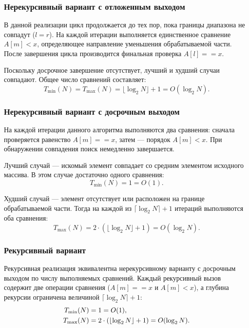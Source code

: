 \subsubsection{Нерекурсивный вариант с отложенным выходом}

В данной реализации цикл продолжается до тех пор, пока границы диапазона не совпадут ($l = r$). На каждой итерации выполняется единственное сравнение $A[m] < x$, определяющее направление уменьшения обрабатываемой части. После завершения цикла производится финальная проверка $A[l] == x$.

Поскольку досрочное завершение отсутствует, лучший и худший случаи совпадают. Общее число сравнений составляет:
\begin{equation}
	T_{\min}(N) = T_{\max}(N) = \lfloor \log_2 N \rfloor + 1 = O(\log_2 N).
\end{equation}

\subsubsection{Нерекурсивный вариант с досрочным выходом}

На каждой итерации данного алгоритма выполняются два сравнения: сначала проверяется равенство $A[m] == x$, затем --- порядок $A[m] < x$. При обнаружении совпадения поиск немедленно завершается.

Лучший случай --- искомый элемент совпадает со средним элементом исходного массива. В этом случае достаточно одного сравнения:
\begin{equation}
	T_{\min}(N) = 1 = O(1).
\end{equation}

Худший случай --- элемент отсутствует или расположен на границе обрабатываемой части. Тогда на каждой из $\lceil\log_2 N \rceil + 1$ итераций выполняются оба сравнения:
\begin{equation}
	T_{\max}(N) = 2 \cdot (\lfloor \log_2 N \rfloor + 1) = O(\log_2 N).
\end{equation}

\subsubsection{Рекурсивный вариант}

Рекурсивная реализация эквивалентна нерекурсивному варианту с досрочным выходом по числу выполняемых сравнений. Каждый рекурсивный вызов содержит две операции сравнения ($A[m] == x$ и $A[m] < x$), а глубина рекурсии ограничена величиной $\lceil\log_2 N \rceil + 1$:
\begin{align}
	T_{\min}(N) &= 1 = O(1), \notag \\
	T_{\max}(N) &= 2 \cdot (\lfloor \log_2 N \rfloor + 1) = O(\log_2 N).
\end{align}

